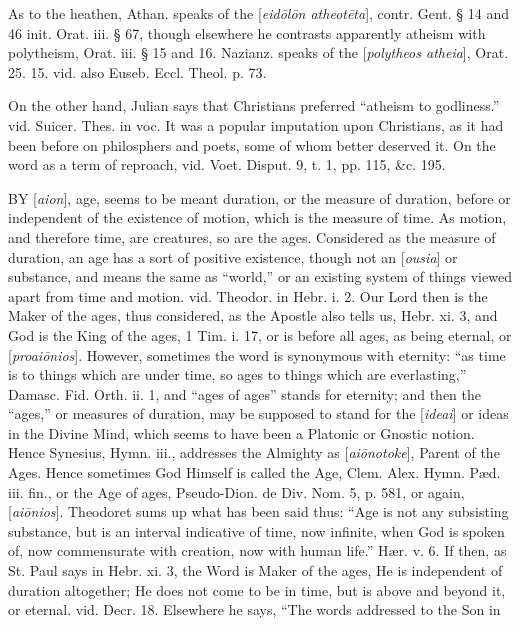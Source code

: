 As to the heathen, Athan. speaks of the [\emph{eid\={o}l\={o}n
atheot\={e}ta}], contr. Gent. § 14 and 46 init. Orat. iii. §
67, though elsewhere he contrasts apparently atheism with polytheism,
Orat. iii. § 15 and 16. Nazianz. speaks of the [\emph{polytheos atheia}],
Orat. 25. 15. vid. also Euseb. Eccl. Theol. p. 73.

On the other hand, Julian says that Christians
preferred ``atheism to godliness.'' vid. Suicer. Thes. in voc. It was a
popular imputation upon Christians, as it had been before on
philosphers and poets, some of whom better deserved it. On the word as
a term of reproach, vid. Voet. Disput. 9, t. 1, pp. 115, \&c. 195.

\xsection{[Aion]}

BY
[\emph{aion}],
age, seems to be meant duration, or the measure of duration, before or
independent of the existence of motion, which is the measure of time.
As motion, and therefore time, are creatures, so are the ages.
Considered as the measure of duration, an age has a sort of positive
existence, though not an [\emph{ousia}] or substance, and means the
same as ``world,'' or an existing system of things viewed apart from
time and motion. vid. Theodor. in Hebr. i. 2. Our Lord then is the
Maker of the ages, thus considered, as the Apostle also tells us, Hebr.
xi. 3, and God is the King of the ages, 1 Tim. i. 17, or is before all
ages, as being eternal, or [\emph{proai\={o}nios}]. However,
sometimes the word is synonymous with eternity: ``as time is to things
which are under time, so ages to things which are everlasting,'' Damasc.
Fid. Orth. ii. 1, and ``ages of ages'' stands for eternity; and then the
``ages,'' or measures of duration, may be supposed to stand for the [\emph{ideai}]
or ideas in the Divine Mind, which seems to have been a Platonic or
Gnostic notion. Hence Synesius, Hymn. iii., addresses the Almighty as
[\emph{ai\={o}notoke}], Parent of the Ages. Hence sometimes God
Himself is called the Age, Clem. Alex. Hymn. Pæd. iii. fin., or the
Age of ages, Pseudo-Dion. de Div. Nom. 5, p. 581, or again, [\emph{ai\={o}nios}].
Theodoret sums up what has been said thus: ``Age is not any subsisting
substance, but is an interval indicative of time, now infinite,
when God is spoken of, now commensurate with creation, now with human
life.'' Hær. v. 6. If then, as St. Paul says in Hebr. xi. 3, the Word
is Maker of the ages, He is independent of duration altogether; He
does not come to be in time, but is above and beyond it, or eternal.
vid. Decr. 18. Elsewhere he says, ``The words addressed to the Son in
